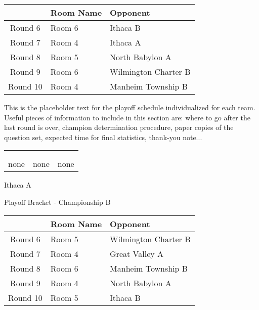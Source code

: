 \documentclass{article}%
\begin{document}
\vspace*{4pt}%
%
\begin{tabularx}{\textwidth}{|c|Y|Y|}%
\hline%
&Room Name&Opponent\\%
\hline%
Round 6&Room 6&Ithaca B\\%
Round 7&Room 4&Ithaca A\\%
Round 8&Room 5&North Babylon A\\%
Round 9&Room 6&Wilmington Charter B\\%
Round 10&Room 4&Manheim Township B\\%
\hline%
\end{tabularx}%
\vspace*{30pt}%
\linebreak%
This is the placeholder text for the playoff schedule individualized for each team. Useful pieces of information to include in this section are: where to go after the last round is over, champion determination procedure, paper copies of the question set, expected time for final statistics, thank{-}you note...%
\vspace*{30pt}%
\newline%
%
\begin{tabularx}{\textwidth}{YYY}%
  &  &  \\%
\\%
none&none&none\\%
\end{tabularx}%
\newpage%
\begin{center}%
\begin{Huge}%
Ithaca A%
\end{Huge}%
\vspace*{12pt}%
\linebreak%
\begin{Large}%
Playoff Bracket {-} Championship B%
\end{Large}%
\end{center}%
\vspace*{4pt}%
%
\begin{tabularx}{\textwidth}{|c|Y|Y|}%
\hline%
&Room Name&Opponent\\%
\hline%
Round 6&Room 5&Wilmington Charter B\\%
Round 7&Room 4&Great Valley A\\%
Round 8&Room 6&Manheim Township B\\%
Round 9&Room 4&North Babylon A\\%
Round 10&Room 5&Ithaca B\\%
\hline%
\end{tabularx}%
\end{document}
